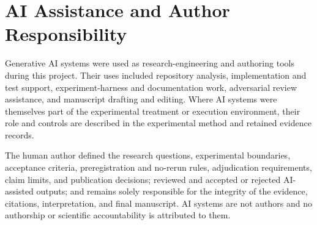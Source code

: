 \section{AI Assistance and Author Responsibility}
\label{sec:ai-assistance}

Generative AI systems were used as research-engineering and authoring tools during this project. Their uses included repository analysis, implementation and test support, experiment-harness and documentation work, adversarial review assistance, and manuscript drafting and editing. Where AI systems were themselves part of the experimental treatment or execution environment, their role and controls are described in the experimental method and retained evidence records.

The human author defined the research questions, experimental boundaries, acceptance criteria, preregistration and no-rerun rules, adjudication requirements, claim limits, and publication decisions; reviewed and accepted or rejected AI-assisted outputs; and remains solely responsible for the integrity of the evidence, citations, interpretation, and final manuscript. AI systems are not authors and no authorship or scientific accountability is attributed to them.
